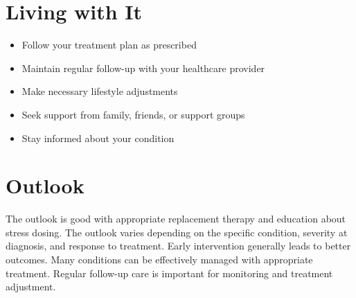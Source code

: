 \section{Living with It}
\begin{itemize}[noitemsep]
  \item Follow your treatment plan as prescribed
  \item Maintain regular follow-up with your healthcare provider
  \item Make necessary lifestyle adjustments
  \item Seek support from family, friends, or support groups
  \item Stay informed about your condition
\end{itemize}
\section{Outlook}
The outlook is good with appropriate replacement therapy and education about stress dosing. The outlook varies depending on the specific condition, severity at diagnosis, and response to treatment. Early intervention generally leads to better outcomes. Many conditions can be effectively managed with appropriate treatment. Regular follow-up care is important for monitoring and treatment adjustment.
